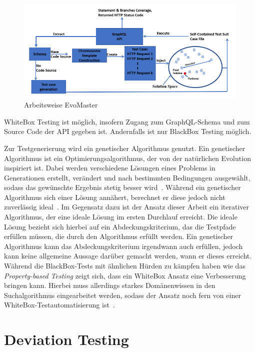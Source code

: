 \begin{figure}
    \centering
    \includegraphics[width=\textwidth,height=\textheight,keepaspectratio]{content/hauptteil/relatedWork/evomaster_framework}
    \caption{Arbeitsweise EvoMaster}
    \label{evomast}
\end{figure}

WhiteBox Testing ist möglich, insofern Zugang zum GraphQL-Schema und zum Source Code der API gegeben ist.
Andernfalls ist nur BlackBox Testing möglich.


Zur Testgenerierung wird ein genetischer Algorithmus genutzt.
Ein genetischer Algorithmus ist ein Optimierungsalgorithmus, der von der natürlichen Evolution inspiriert ist.
Dabei werden verschiedene Lösungen eines Problems in Generationen erstellt, verändert und nach bestimmten Bedingungen ausgewählt,
sodass das gewünschte Ergebnis stetig besser wird~\cite[vgl.]{genalgo}.
Während ein genetischer Algorithmus sich einer Lösung annähert, berechnet er diese jedoch nicht zuverlässig ideal~\cite[vgl. Fazit]{genalgo}.
Im Gegensatz dazu ist der Ansatz dieser Arbeit ein iterativer Algorithmus, der eine ideale Lösung im ersten Durchlauf erreicht.
Die ideale Lösung bezieht sich hierbei auf ein Abdeckungskriterium, das die Testpfade erfüllen müssen, die durch den Algorithmus erfüllt werden.
Ein genetischer Algorithmus kann das Abdeckungskriterium irgendwann auch erfüllen, jedoch kann keine allgemeine Aussage darüber gemacht werden, wann er dieses erreicht.
Während die BlackBox-Tests mit ähnlichen Hürden zu kämpfen haben wie das \textit{Property-based Testing} zeigt sich, dass ein WhiteBox
Ansatz eine Verbesserung bringen kann.
Hierbei muss allerdings starkes Domänenwissen in den Suchalgorithmus eingearbeitet werden, sodass der Ansatz noch fern von einer WhiteBox-Testautomatisierung ist~\cite[vgl. Discussion and Future Directions]{belhadi2022whitebox}.

\section{Deviation Testing}


